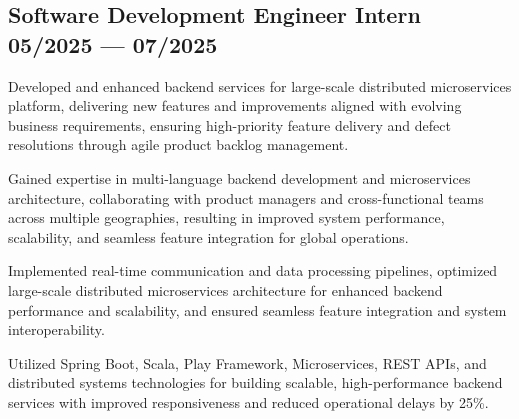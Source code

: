 \subsection{{Software Development Engineer Intern \hfill 05/2025 --- 07/2025}}
\begin{zitemize}
    \item Developed and enhanced backend services for large-scale distributed microservices platform, delivering new features and improvements aligned with evolving business requirements, ensuring high-priority feature delivery and defect resolutions through agile product backlog management.
    \item Gained expertise in multi-language backend development and microservices architecture, collaborating with product managers and cross-functional teams across multiple geographies, resulting in improved system performance, scalability, and seamless feature integration for global operations.
    \item Implemented real-time communication and data processing pipelines, optimized large-scale distributed microservices architecture for enhanced backend performance and scalability, and ensured seamless feature integration and system interoperability.
    \item Utilized Spring Boot, Scala, Play Framework, Microservices, REST APIs, and distributed systems technologies for building scalable, high-performance backend services with improved responsiveness and reduced operational delays by 25\%.
\end{zitemize}

